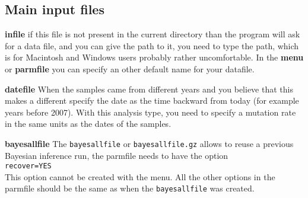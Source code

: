 \subsection{Main input files}
\begin{description}
\item{\textbf{infile}} if this file is not present in the current directory 
than the program will ask for a data file, and you can
give the path to it, you need to type the path, which is for Macintosh and Windows users probably rather uncomfortable. In the \textbf {menu} or \textbf{parmfile} you can specify an other default name for your datafile. 
\item{\textbf{datefile}} When the samples came from different years and you believe that this makes a different specify the date as the time backward from today (for example years before 2007). With this analysis type, you need to specify a mutation rate in the same units as the dates of the samples.
\item{\textbf{bayesallfile}} The  \texttt{bayesallfile}  or  \texttt{bayesallfile.gz} allows to reuse a previous Bayesian inference run, the parmfile needs to have the option \\
\texttt{recover=YES}\\
This option cannot be created with the menu.
All the other options in the parmfile should be the same as when the \texttt{bayesallfile} was created.
\end{description}
